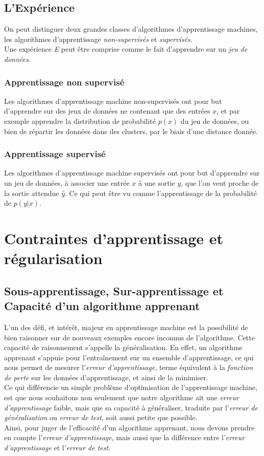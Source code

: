 \documentclass[10pt,a4paper]{report}
\begin{document}
		\subsection{L'Expérience}
		On peut distinguer deux grandes classes d'algorithmes d'apprentissage machines, les algorithmes d'apprentissage \emph{non-supervisés} et \emph{supervisés}.\\
		Une expérience \emph{E} peut être comprise comme le fait d'apprendre sur un \emph{jeu de données}.\\
			\subsubsection{Apprentissage non supervisé}
			Les algorithmes d'apprentissage machine non-supervisés ont pour but d'apprendre sur des jeux de données ne contenant que des entrées $x$, et par exemple apprendre la distribution de probabilité $p(x)$ du jeu de données, ou bien de répartir les données dans des clusters, par le biais d'une distance donnée.\\
			\subsubsection{Apprentissage supervisé}
			Les algorithmes d'apprentissage machine supervisés ont pour but d'apprendre sur un jeu de données, à associer une entrée $x$ à une sortie $y$, que l'on veut proche de la sortie attendue $\hat{y}$. Ce qui peut être vu comme l'apprentissage de la probabilité de $p(y|x)$.
	
	\section{Contraintes d'apprentissage et régularisation}
		\subsection{Sous-apprentissage, Sur-apprentissage et Capacité d'un algorithme apprenant}
		L'un des défi, et intérêt, majeur en apprentissage machine est la possibilité de bien raisonner sur de nouveaux exemples encore inconnus de l'algorithme. Cette capacité de raisonnement s'appelle la généralisation.
		En effet, un algorithme apprenant s'appuie pour l'entraînement sur un ensemble d'apprentissage, ce qui nous permet de mesurer l'\emph{erreur d'apprentissage}, terme équivalent à la \emph{fonction de perte} sur les données d'apprentissage, et ainsi de la minimiser.\\
		Ce qui différencie un simple problème d'optimisation de l'apprentissage machine, est que nous souhaitons non seulement que notre algorithme ait une \emph{erreur d’apprentissage} faible, mais que sa capacité à généraliser, traduite par l'\emph{erreur de généralisation} ou \emph{erreur de test}, soit aussi petite que possible.\\
	Ainsi, pour juger de l'efficacité d'un algorithme apprenant, nous devons prendre en compte l'\emph{erreur d'apprentissage}, mais aussi que la différence entre l'\emph{erreur d'apprentissage} et l'\emph{erreur de test}.
\end{document}
